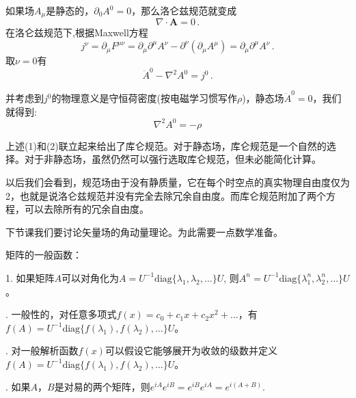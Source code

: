 \documentclass[CJK]{beamer}
\begin{document}
\begin{frame}
\bch
如果场$A_\mu$是静态的，$\partial_0 A^0 = 0$，那么洛仑兹规范就变成
\begin{equation}
\nabla \cdot \mathbf{A} = 0\, .
\end{equation}
在洛仑兹规范下,根据Maxwell方程
$$j^\nu = \partial_\mu F^{\mu\nu} = \partial_\mu \partial^\mu A^\nu - \partial^\nu (\partial_\mu A^\mu) =  \partial_\mu \partial^\mu A^\nu \, .$$
取$\nu = 0$有
$$\ddot A^0 - \nabla^2 A^0 = j^0\, .$$

并考虑到$j^0$的物理意义是守恒荷密度(按电磁学习惯写作$\rho$)，静态场$\ddot A^0=0$，我们就得到:
\begin{equation}
\nabla^2 A^0 = - \rho
\end{equation}
\ech
\end{frame}

\begin{frame}
\bch
上述(1)和(2)联立起来给出了库仑规范。对于静态场，库仑规范是一个自然的选择。对于非静态场，虽然仍然可以强行选取库仑规范，但未必能简化计算。

\skipline
以后我们会看到，规范场由于没有静质量，它在每个时空点的真实物理自由度仅为2，也就是说洛仑兹规范并没有完全去除冗余自由度。而库仑规范附加了两个方程，可以去除所有的冗余自由度。

\ech
\end{frame}

\begin{frame}
\bch
下节课我们要讨论矢量场的角动量理论。为此需要一点数学准备。
\ech
\end{frame}

\begin{frame}
\bch
矩阵的一般函数：
\skipline

1. 如果矩阵$A$可以对角化为$A = U^{-1} \mathrm{diag}\{\lambda_1, \lambda_2, \ldots\} U$, 则$A^n = U^{-1} \mathrm{diag}\{\lambda_1^n, \lambda_2^n, \ldots\} U$。

. 一般性的，对任意多项式$f(x) = c_0 + c_1 x + c_2 x^2 + \ldots $，有$f(A) =   U^{-1} \mathrm{diag}\{f(\lambda_1), f(\lambda_2), \ldots\} U$。

. 对一般解析函数$f(x)$可以假设它能够展开为收敛的级数并定义$f(A) =   U^{-1} \mathrm{diag}\{f(\lambda_1), f(\lambda_2), \ldots\} U$。

. 如果$A$，$B$是对易的两个矩阵，则$ e^{iA} e^{iB} = e^{iB} e^{iA} =  e^{i(A+B)}$.
\ech
\end{frame}
\end{document}
